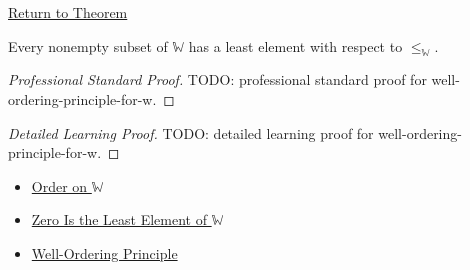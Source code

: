 \newpage
{}
\label{prf:well-ordering-principle-for-w}

\begin{remark*}[Return]
\hyperref[thm:well-ordering-principle-for-w]{Return to Theorem}
\end{remark*}

\begin{theorem*}
Every nonempty subset of $\mathbb{W}$ has a least element with respect to
$\leq_{\mathbb{W}}$.
\end{theorem*}

\begin{proof}[Professional Standard Proof]
\LRAProofBodyStart
TODO: professional standard proof for well-ordering-principle-for-w.
\end{proof}

\begin{proof}[Detailed Learning Proof]
\LRAProofBodyStart
TODO: detailed learning proof for well-ordering-principle-for-w.
\end{proof}

\begin{remark*}
\end{remark*}

\begin{dependencies}
\begin{itemize}
  \item \hyperref[def:order-on-w]{Order on $\mathbb{W}$}
  \item \hyperref[thm:zero-least-element-of-w]{Zero Is the Least Element of $\mathbb{W}$}
  \item \hyperref[thm:well-ordering-principle]{Well-Ordering Principle}
\end{itemize}
\end{dependencies}

\clearpage
